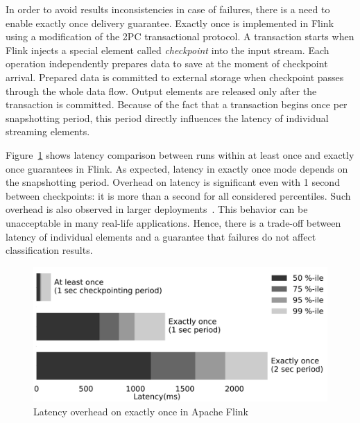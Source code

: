 In order to avoid results inconsistencies in case of failures, there is a need to enable exactly once delivery guarantee. 
Exactly once is implemented in Flink using a modification of the 2PC transactional protocol. A transaction starts when Flink injects a special element called {\em checkpoint} into the input stream. Each operation independently prepares data to save at the moment of checkpoint arrival. Prepared data is committed to external storage when checkpoint passes through the whole data flow. Output elements are released only after the transaction is committed. Because of the fact that a transaction begins once per snapshotting period, this period directly influences the latency of individual streaming elements.

Figure~\ref{fault_tolerance} shows latency comparison between runs within at least once and exactly once guarantees in Flink. As expected, latency in exactly once mode depends on the snapshotting period. Overhead on latency is significant even with 1 second between checkpoints: it is more than a second for all considered percentiles. Such overhead is also observed in larger deployments~\cite{we2018beyondmr}. This behavior can be unacceptable in many real-life applications. Hence, there is a trade-off between latency of individual elements and a guarantee that failures do not affect classification results.

\begin{figure}[htbp]
  \centering
  \includegraphics[scale=0.09]{pics/fault_tolerance}
  \caption{Latency overhead on exactly once in Apache Flink}
  \label {fault_tolerance}
\end{figure}

